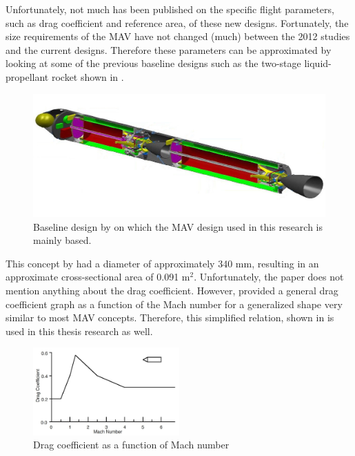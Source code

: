 \noindent
Unfortunately, not much has been published on the specific flight parameters, such as drag coefficient and reference area, of these new designs. Fortunately, the size requirements of the \ac{MAV} have not changed (much) between the 2012 studies and the current designs. Therefore these parameters can be approximated by looking at some of the previous baseline designs such as the two-stage liquid-propellant rocket shown in . 


\begin{figure}[H]
\centering
\includegraphics[width=0.5 \textwidth]{figures/launcher_methods/baseline_liquid2_trinidad2012.jpg}
\caption{Baseline design by \cite{trinidad2012} on which the \ac{MAV} design used in this research is mainly based.}
\label{fig:baseline_liquid2_trinidad2012}
\end{figure}

\noindent
This concept by \cite{trinidad2012} had a diameter of approximately 340 mm, resulting in an approximate cross-sectional area of 0.091 m$^{2}$. Unfortunately, the paper does not mention anything about the drag coefficient. However, \cite{whitehead2004mars} provided a general drag coefficient graph as a function of the Mach number for a generalized shape very similar to most \ac{MAV} concepts. Therefore, this simplified relation, shown in  is used in this thesis research as well.

\begin{figure}[H]
\centering
\includegraphics[width=0.5\textwidth]{figures/launcher_methods/dragcoeff_whitehead2004mars.jpg}
\caption{Drag coefficient as a function of Mach number \citep{whitehead2004mars}}
\label{fig:dragcoeff_whitehead2004mars}
\end{figure}

